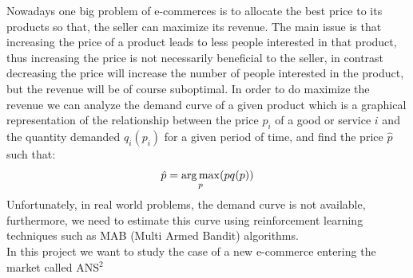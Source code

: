 Nowadays one big problem of e-commerces is to allocate the best price to its products so that,
the seller can maximize its revenue.
The main issue is that increasing the price of a product leads to less people interested in that product, thus
increasing the price is not necessarily beneficial to the seller, in contrast decreasing the price will increase the number
of people interested in the product, but the revenue will be of course suboptimal.
In order to do maximize the revenue we can analyze the demand curve of a given product which is
a graphical representation of the relationship between the price $p_i$ of a good or service $i$ and the quantity demanded $q_i(p_i)$
for a given period of time, and find the price $\hat{p}$ such that:
\begin{align*}
    \hat{p} = \operatorname*{arg\,max}_p(pq(p))
\end{align*}
Unfortunately, in real world problems, the demand curve is not available, furthermore, we need to estimate this curve using
reinforcement learning techniques such as MAB (Multi Armed Bandit) algorithms.\\
In this project we want to study the case of a new e-commerce entering the market called ANS$^2$